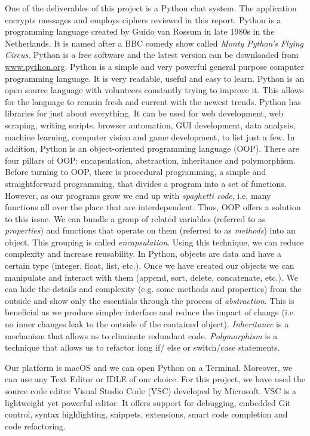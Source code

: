 One of the deliverables of this project is a Python chat system. The application encrypts messages and employs ciphers reviewed in this report. Python is a programming language created by Guido van Rossum in late 1980s in the Netherlands. It is named after a BBC comedy show called \emph{Monty Python's Flying Circus}. Python is a free software and the latest version can be downloaded from \url{www.python.org}. Python is a simple and very powerful general purpose computer programming language. It is very readable, useful and easy to learn. Python is an open source language with volunteers constantly trying to improve it. This allows for the language to remain fresh and current with the newest trends. Python has libraries for just about everything. It can be used for web development, web scraping, writing scripts, browser automation, GUI development, data analysis, machine learning, computer vision and game development, to list just a few. In addition, Python is an object-oriented programming language (OOP). There are four pillars of OOP: encapsulation, abstraction, inheritance and polymorphism. Before turning to OOP, there is procedural programming, a simple and straightforward programming, that divides a program into a set of functions. However, as our programs grow we end up with \emph{spaghetti code}, i.e. many functions all over the place that are interdependent. Thus, OOP offers a solution to this issue. We can bundle a group of related variables (referred to as \emph{properties}) and functions that operate on them (referred to as \emph{methods}) into an object. This grouping is called \emph{encapsulation}. Using this technique, we can reduce complexity and increase reusability. In Python, objects are data and have a certain type (integer, float, list, etc.). Once we have created our objects we can manipulate and interact with them (append, sort, delete, concatenate, etc.). We can hide the details and complexity (e.g. some methods and properties) from the outside and show only the essentials through the process of \emph{abstraction}. This is beneficial as we produce simpler interface and reduce the impact of change (i.e. no inner changes leak to the outside of the contained object). \emph{Inheritance} is a mechanism that allows us to eliminate redundant code. \emph{Polymorphism} is a technique that allows us to refactor long if/ else or switch/case statements. 

Our platform is macOS and we can open Python on a Terminal. Moreover, we can use any Text Editor or IDLE of our choice. For this project, we have used the source code editor Visual Studio Code (VSC) developed by Microsoft. VSC is a lightweight yet powerful editor. It offers support for debugging, embedded Git control, syntax highlighting, snippets, extensions, smart code completion and code refactoring. 

